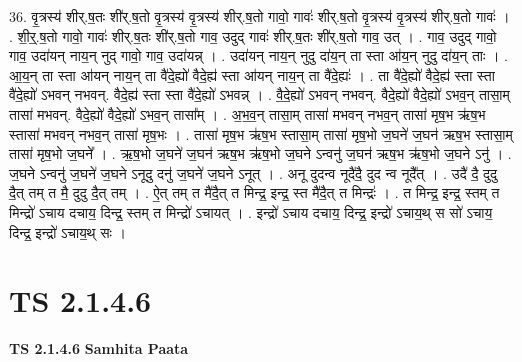 \documentclass[17pt]{extarticle}
\begin{document}
36. वृ॒त्रस्य॑ शीर्.ष॒तः शी॑र्.ष॒तो वृ॒त्रस्य॑ वृ॒त्रस्य॑ शीर्.ष॒तो गावो॒ गावः॑ शीर्.ष॒तो वृ॒त्रस्य॑ वृ॒त्रस्य॑ शीर्.ष॒तो गावः॑ । . शी॒र्॒.ष॒तो गावो॒ गावः॑ शीर्.ष॒तः शी॑र्.ष॒तो गाव॒ उदुद् गावः॑ शीर्.ष॒तः शी॑र्.ष॒तो गाव॒ उत् । . गाव॒ उदुद् गावो॒ गाव॒ उदा॑यन् नाय॒न् नुद् गावो॒ गाव॒ उदा॑यन्न् । . उदा॑यन् नाय॒न् नुदु दा॑य॒न् ता स्ता आ॑य॒न् नुदु दा॑य॒न् ताः । . आ॒य॒न् ता स्ता आ॑यन् नाय॒न् ता वै॑दे॒ह्यो॑ वैदे॒ह्य॑ स्ता आ॑यन् नाय॒न् ता वै॑दे॒ह्यः॑ । . ता वै॑दे॒ह्यो॑ वैदे॒ह्य॑ स्ता स्ता वै॑दे॒ह्यो॑ ऽभवन् नभवन्. वैदे॒ह्य॑ स्ता स्ता वै॑दे॒ह्यो॑ ऽभवन्न् । . वै॒दे॒ह्यो॑ ऽभवन् नभवन्. वैदे॒ह्यो॑ वैदे॒ह्यो॑ ऽभव॒न् तासा॒म् तासा॑ मभवन्. वैदे॒ह्यो॑ वैदे॒ह्यो॑ ऽभव॒न् तासा᳚म् । . अ॒भ॒व॒न् तासा॒म् तासा॑ मभवन् नभव॒न् तासा॑ मृष॒भ ऋ॑ष॒भ स्तासा॑ मभवन् नभव॒न् तासा॑ मृष॒भः । . तासा॑ मृष॒भ ऋ॑ष॒भ स्तासा॒म् तासा॑ मृष॒भो ज॒घने॑ ज॒घन॑ ऋष॒भ स्तासा॒म् तासा॑ मृष॒भो ज॒घने᳚ । . ऋ॒ष॒भो ज॒घने॑ ज॒घन॑ ऋष॒भ ऋ॑ष॒भो ज॒घने ऽन्वनु॑ ज॒घन॑ ऋष॒भ ऋ॑ष॒भो ज॒घने ऽनु॑ । . ज॒घने ऽन्वनु॑ ज॒घने॑ ज॒घने ऽनूदु दनु॑ ज॒घने॑ ज॒घने ऽनूत् । . अनू दुदन्व नूदै॑दै॒ दुद न्व नूदै᳚त् । . उदै॑ दै॒ दुदु दै॒त् तम् त मै॒ दुदु दै॒त् तम् । . ऐ॒त् तम् त मै॑दै॒त् त मिन्द्र॒ इन्द्र॒ स्त मै॑दै॒त् त मिन्द्रः॑ । . त मिन्द्र॒ इन्द्र॒ स्तम् त मिन्द्रो॑ ऽचाय दचाय॒ दिन्द्र॒ स्तम् त मिन्द्रो॑ ऽचायत् । . इन्द्रो॑ ऽचाय दचाय॒ दिन्द्र॒ इन्द्रो॑ ऽचाय॒थ् स सो॑ ऽचाय॒ दिन्द्र॒ इन्द्रो॑ ऽचाय॒थ् सः । \newline
\pagebreak
{}

\section{ TS 2.1.4.6 }

\textbf{TS 2.1.4.6 } \newline
\textbf{Samhita Paata} \newline
\end{document}
